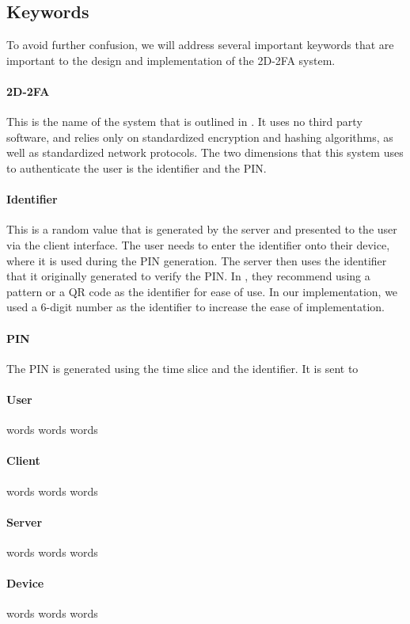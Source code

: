 \documentclass[11pt]{article} %
\begin{document}
\subsection{Keywords}

To avoid further confusion, we will address several important keywords
that are important to the design and implementation of the 2D-2FA
system. 

\paragraph{2D-2FA} This is the name of the system that is outlined in
\cite{shirvanian2d2fa}. It uses no third party software, and relies only
on standardized encryption and hashing algorithms, as well as
standardized network protocols. The two dimensions that this system uses
to authenticate the user is the identifier and the PIN.

\paragraph{Identifier} This is a random value that is generated by the
server and presented to the user via the client interface. The user
needs to enter the identifier onto their device, where it is used during
the PIN generation. The server then uses the identifier that it
originally generated to verify the PIN. In \cite{shirvanian2d2fa}, they
recommend using a pattern or a QR code as the identifier for ease of
use. In our implementation, we used a 6-digit number as the identifier
to increase the ease of implementation. 

\paragraph{PIN} The PIN is generated using the time slice and the
identifier. It is sent to 
\paragraph{User} words words words
\paragraph{Client} words words words
\paragraph{Server} words words words
\paragraph{Device} words words words
\end{document}
